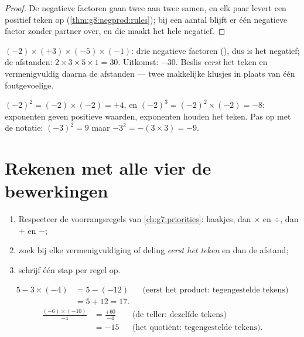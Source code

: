 \begin{proof}
De negatieve factoren gaan twee aan twee samen, en elk paar levert een positief teken
op (\cref{thm:g8:negprod:rules}); bij een  aantal blijft er één negatieve factor
zonder partner over, en die maakt het hele  negatief.
\end{proof}

\begin{example}\label{ex:g8:negprod:many}
$(-2) \times (+3) \times (-5) \times (-1)$: drie negatieve factoren (), dus is
het  negatief; de afstanden: $2 \times 3 \times 5 \times 1 = 30$. Uitkomst:
$-30$. Beslis \emph{eerst} het teken en vermenigvuldig daarna de afstanden --- twee
makkelijke klusjes in plaats van één foutgevoelige.
\end{example}

\begin{example}\label{ex:g8:negprod:powers}
$(-2)^2 = (-2) \times (-2) = +4$, en $(-2)^3 = (-2)^2 \times (-2) = -8$: 
exponenten geven positieve waarden,  exponenten houden het teken. Pas op met de
notatie: $(-3)^2 = 9$ maar $-3^2 = -(3 \times 3) = -9$.
\end{example}

\section{Rekenen met alle vier de bewerkingen}

\begin{method}\label{met:g8:negprod:compute}
\begin{enumerate}
  \item Respecteer de voorrangsregels van \cref{ch:g7:priorities}: haakjes, dan
        $\times$ en $\div$, dan $+$ en $-$;
  \item zoek bij elke vermenigvuldiging of deling \emph{eerst het teken} en dan de
        afstand;
  \item schrijf één stap per regel op.
\end{enumerate}
\end{method}

\begin{example}\label{ex:g8:negprod:compute}
\begin{align*}
5 - 3 \times (-4)
&= 5 - (-12) && \text{(eerst het product: tegengestelde tekens)}\\
&= 5 + 12 = 17 .
\end{align*}
\begin{align*}
\frac{(-6) \times (-10)}{-4}
&= \frac{+60}{-4} && \text{(de teller: dezelfde tekens)}\\
&= -15 && \text{(het quotiënt: tegengestelde tekens).}
\end{align*}
\end{example}

